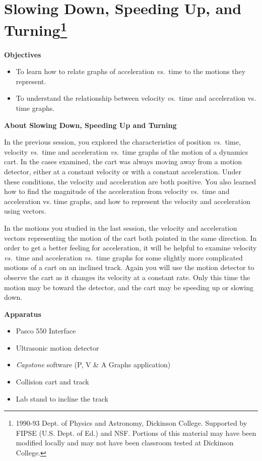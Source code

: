 
\section{Slowing Down, Speeding Up, and Turning\footnote{
1990-93 Dept. of Physics and Astronomy, Dickinson College. Supported by FIPSE
(U.S. Dept. of Ed.) and NSF. Portions of this material may have been modified
locally and may not have been classroom tested at Dickinson College.
}}

\makelabheader %

\medskip
\textbf{Objectives }

\begin{itemize}
\item To learn how to relate graphs of acceleration \textit{vs.}~time to the motions they represent. 
\item To understand the relationship between velocity \textit{vs.}~time and acceleration vs.
time graphs.
\end{itemize}

\medskip
\textbf{About Slowing Down, Speeding Up and Turning }

In the previous session, you explored the characteristics of position \textit{vs.}~time,
velocity \textit{vs.}~time and acceleration  \textit{vs.}~time graphs of the motion of a dynamics
cart. In the cases examined, the cart was always moving away from a motion detector,
either at a constant velocity or with a constant acceleration. Under these conditions,
the velocity and acceleration are both positive. You also learned how to find
the magnitude of the acceleration from velocity \textit{vs.}~time and acceleration vs.
time graphs, and how to represent the velocity and acceleration using vectors. 

In the motions you studied in the last session, the velocity and acceleration
vectors representing the motion of the cart both pointed in the same direction.
In order to get a better feeling for acceleration, it will be helpful to examine
velocity \textit{vs.}~time and acceleration \textit{vs.}~time graphs for some slightly more complicated
motions of a cart on an inclined track. Again you will use the motion detector
to observe the cart as it changes its velocity at a constant rate. Only this
time the motion may be toward the detector, and the cart may be speeding up
or slowing down.

\medskip
\textbf{Apparatus }

\begin{itemize}
\item Pasco 550 Interface
\item Ultrasonic motion detector 
\item \textit{Capstone} software (P, V \& A Graphs application)
\item Collision cart and track 
\item Lab stand to incline the track
\end{itemize}

